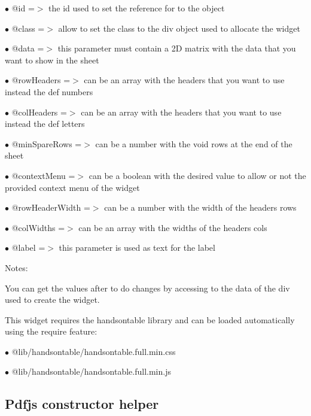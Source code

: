 \documentclass[a4paper]{book}
\begin{document}
\begin{compactitem}
\item[\color{myblue}$\bullet$] @id             =$>$ the id used to set the reference for to the object
\item[\color{myblue}$\bullet$] @class          =$>$ allow to set the class to the div object used to allocate the widget
\item[\color{myblue}$\bullet$] @data           =$>$ this parameter must contain a 2D matrix with the data that you want to show
                   in the sheet
\item[\color{myblue}$\bullet$] @rowHeaders     =$>$ can be an array with the headers that you want to use instead the def numbers
\item[\color{myblue}$\bullet$] @colHeaders     =$>$ can be an array with the headers that you want to use instead the def letters
\item[\color{myblue}$\bullet$] @minSpareRows   =$>$ can be a number with the void rows at the end of the sheet
\item[\color{myblue}$\bullet$] @contextMenu    =$>$ can be a boolean with the desired value to allow or not the provided
                   context menu of the widget
\item[\color{myblue}$\bullet$] @rowHeaderWidth =$>$ can be a number with the width of the headers rows
\item[\color{myblue}$\bullet$] @colWidths      =$>$ can be an array with the widths of the headers cols
\item[\color{myblue}$\bullet$] @label          =$>$ this parameter is used as text for the label
\end{compactitem}

Notes:

You can get the values after to do changes by accessing to the data of the div used to create
the widget.

This widget requires the handsontable library and can be loaded automatically using the require
feature:

\begin{compactitem}
\item[\color{myblue}$\bullet$] @lib/handsontable/handsontable.full.min.css
\item[\color{myblue}$\bullet$] @lib/handsontable/handsontable.full.min.js
\end{compactitem}

\hypertarget{toc458}{}
\subsection{Pdfjs constructor helper}
\end{document}
